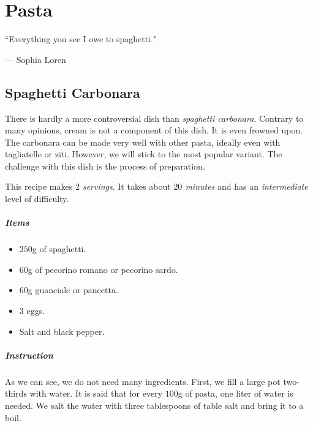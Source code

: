 \chapter{Pasta}
\epigraph{``Everything you see I owe to spaghetti."}{--- \textup{Sophia Loren}}

\section{Spaghetti Carbonara}
\label{spaghetticarbonara}
There is hardly a more controversial dish than \emph{spaghetti carbonara}. Contrary to many opinions, cream is not a component of this dish. It is even frowned upon. The carbonara can be made very well with other pasta, ideally even with tagliatelle or ziti. However, we will stick to the most popular variant. The challenge with this dish is the process of preparation.

This recipe makes \emph{$2$ servings}. It takes about \emph{$20$ minutes} and has an \emph{intermediate} level of difficulty. 

\paragraph{Items}
\begin{itemize}[noitemsep]
    \item[\ding{182}] $250$g of spaghetti.
    \item[\ding{183}] $60$g of pecorino romano or pecorino sardo.
    \item[\ding{184}] $60$g guanciale or pancetta.
    \item[\ding{185}] $3$ eggs.
    \item[\ding{186}] Salt and black pepper.
\end{itemize}

\paragraph{Instruction} 
As we can see, we do not need many ingredients. First, we fill a large pot two-thirds with water. It is said that for every $100$g of pasta, one liter of water is needed. We salt the water with three tablespoons of table salt and bring it to a boil.

